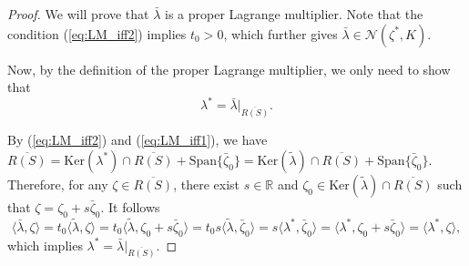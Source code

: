 \documentclass[10pt,a4paper]{amsart}
\begin{document}
\begin{proof}
We will prove that $\bar{\lambda}$ is a proper Lagrange multiplier. Note that the  condition (\ref{eq:LM_iff2}) implies $t_0>0$, which further gives $\bar{\lambda}\in \mathcal{N}(\zeta^*,K)$. 

Now, by the definition of the proper Lagrange multiplier,  we only need to show that
$$\lambda^* = \bar{\lambda}|_{\overline{R(S)}}.$$

By  (\ref{eq:LM_iff2}) and (\ref{eq:LM_iff1}), we have $\overline{R(S)} = \mathrm{Ker}(\lambda^*)\cap \overline{R(S)} + \mathrm{Span}\{\bar{\zeta}_0\} = \mathrm{Ker}(\tilde{\lambda})\cap \overline{R(S)} + \mathrm{Span}\{\bar{\zeta}_0\}$. Therefore, for any $\zeta \in \overline{R(S)}$, there exist $s\in \mathbb{R}$ and $\zeta_0\in \mathrm{Ker}(\tilde{\lambda})\cap \overline{R(S)}$ such that $\zeta = \zeta_0 + s\bar{\zeta}_0$. It follows
$$\langle \bar{\lambda}, \zeta\rangle =  t_0 \langle \tilde{\lambda}, \zeta\rangle =  t_0 \langle \tilde{\lambda}, \zeta_0 + s\bar{\zeta}_0\rangle = t_0s\langle \tilde{\lambda}, \bar{\zeta}_0\rangle = s\langle \lambda^*, \bar{\zeta}_0\rangle =  \langle \lambda^*, \zeta_0 + s\bar{\zeta}_0\rangle = \langle \lambda^*, \zeta\rangle,$$
which implies $\lambda^* = \bar{\lambda}|_{\overline{R(S)}}.$
\end{proof}
\end{document}
